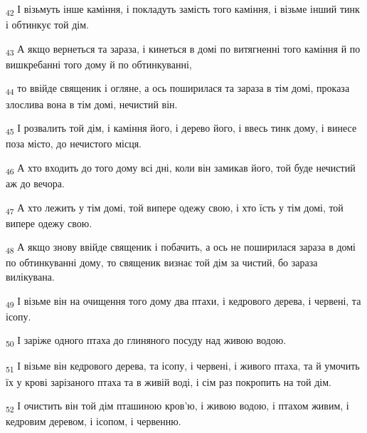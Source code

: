 \begin{tcolorbox}
\textsubscript{42} І візьмуть інше каміння, і покладуть замість того каміння, і візьме інший тинк і обтинкує той дім.
\end{tcolorbox}
\begin{tcolorbox}
\textsubscript{43} А якщо вернеться та зараза, і кинеться в домі по витягненні того каміння й по вишкребанні того дому й по обтинкуванні,
\end{tcolorbox}
\begin{tcolorbox}
\textsubscript{44} то ввійде священик і огляне, а ось поширилася та зараза в тім домі, проказа злослива вона в тім домі, нечистий він.
\end{tcolorbox}
\begin{tcolorbox}
\textsubscript{45} І розвалить той дім, і каміння його, і дерево його, і ввесь тинк дому, і винесе поза місто, до нечистого місця.
\end{tcolorbox}
\begin{tcolorbox}
\textsubscript{46} А хто входить до того дому всі дні, коли він замикав його, той буде нечистий аж до вечора.
\end{tcolorbox}
\begin{tcolorbox}
\textsubscript{47} А хто лежить у тім домі, той випере одежу свою, і хто їсть у тім домі, той випере одежу свою.
\end{tcolorbox}
\begin{tcolorbox}
\textsubscript{48} А якщо знову ввійде священик і побачить, а ось не поширилася зараза в домі по обтинкуванні дому, то священик визнає той дім за чистий, бо зараза вилікувана.
\end{tcolorbox}
\begin{tcolorbox}
\textsubscript{49} І візьме він на очищення того дому два птахи, і кедрового дерева, і червені, та ісопу.
\end{tcolorbox}
\begin{tcolorbox}
\textsubscript{50} І заріже одного птаха до глиняного посуду над живою водою.
\end{tcolorbox}
\begin{tcolorbox}
\textsubscript{51} І візьме він кедрового дерева, та ісопу, і червені, і живого птаха, та й умочить їх у крові зарізаного птаха та в живій воді, і сім раз покропить на той дім.
\end{tcolorbox}
\begin{tcolorbox}
\textsubscript{52} І очистить він той дім пташиною кров'ю, і живою водою, і птахом живим, і кедровим деревом, і ісопом, і червенню.
\end{tcolorbox}
